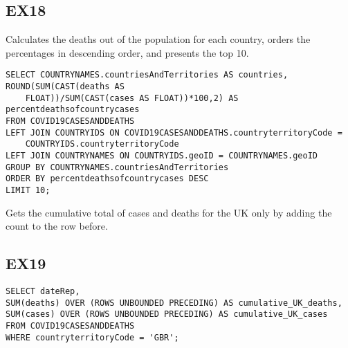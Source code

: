 \documentclass{article}
\begin{document}
\subsection{EX18}
Calculates the deaths out of the population for each country, orders the percentages in descending order, and presents the top 10. 
\begin{verbatim}
SELECT COUNTRYNAMES.countriesAndTerritories AS countries, ROUND(SUM(CAST(deaths AS 
    FLOAT))/SUM(CAST(cases AS FLOAT))*100,2) AS percentdeathsofcountrycases
FROM COVID19CASESANDDEATHS
LEFT JOIN COUNTRYIDS ON COVID19CASESANDDEATHS.countryterritoryCode = 
    COUNTRYIDS.countryterritoryCode
LEFT JOIN COUNTRYNAMES ON COUNTRYIDS.geoID = COUNTRYNAMES.geoID
GROUP BY COUNTRYNAMES.countriesAndTerritories
ORDER BY percentdeathsofcountrycases DESC
LIMIT 10;

\end{verbatim}
Gets the cumulative total of cases and deaths for the UK only by adding the count to the row before.
\subsection{EX19}
\begin{verbatim}
SELECT dateRep,
SUM(deaths) OVER (ROWS UNBOUNDED PRECEDING) AS cumulative_UK_deaths,
SUM(cases) OVER (ROWS UNBOUNDED PRECEDING) AS cumulative_UK_cases
FROM COVID19CASESANDDEATHS
WHERE countryterritoryCode = 'GBR';
\end{verbatim}
\end{document}
